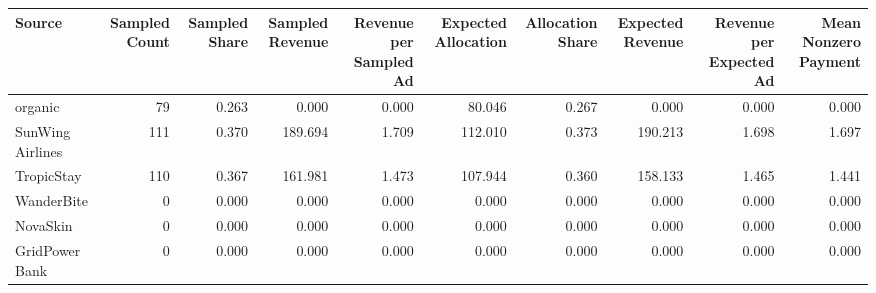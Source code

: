 \begin{tabular}{lrrrrrrrrr}
\hline
Source & Sampled Count & Sampled Share & Sampled Revenue & Revenue per Sampled Ad & Expected Allocation & Allocation Share & Expected Revenue & Revenue per Expected Ad & Mean Nonzero Payment \\
\hline
organic & 79 & 0.263 & 0.000 & 0.000 & 80.046 & 0.267 & 0.000 & 0.000 & 0.000 \\
SunWing Airlines & 111 & 0.370 & 189.694 & 1.709 & 112.010 & 0.373 & 190.213 & 1.698 & 1.697 \\
TropicStay & 110 & 0.367 & 161.981 & 1.473 & 107.944 & 0.360 & 158.133 & 1.465 & 1.441 \\
WanderBite & 0 & 0.000 & 0.000 & 0.000 & 0.000 & 0.000 & 0.000 & 0.000 & 0.000 \\
NovaSkin & 0 & 0.000 & 0.000 & 0.000 & 0.000 & 0.000 & 0.000 & 0.000 & 0.000 \\
GridPower Bank & 0 & 0.000 & 0.000 & 0.000 & 0.000 & 0.000 & 0.000 & 0.000 & 0.000 \\
\hline
\end{tabular}
